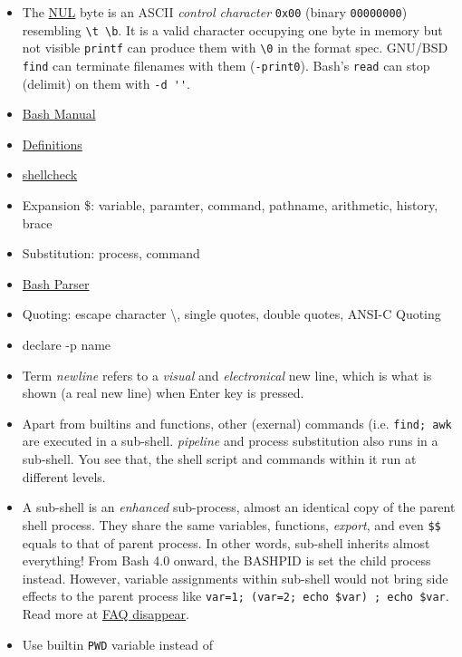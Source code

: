 \begin{itemize}
\item The \uline{NUL} byte is an ASCII \textit{control character}
  \lstinline|0x00| (binary \lstinline|00000000|) resembling
  \lstinline|\t \b|. It is a valid character occupying one byte in
  memory but not visible \lstinline|printf| can produce them with
  \lstinline|\0| in the format spec. GNU/BSD \lstinline|find| can
  terminate filenames with them (\lstinline|-print0|). Bash's
  \lstinline|read| can stop (delimit) on them with
  \lstinline|-d ''|.
\item 
  \href{https://www.gnu.org/software/bash/manual/bash.html}{Bash
    Manual}
\item
  \href{https://www.gnu.org/software/bash/manual/bash.html#Definitions}{Definitions}
\item \href{https://github.com/koalaman/shellcheck}{shellcheck}
\item Expansion \$: variable, paramter, command, pathname,
  arithmetic, history, brace
\item Substitution: process, command
\item \href{http://mywiki.wooledge.org/BashParser}{Bash Parser}
\item Quoting: escape character \textbackslash{}, single quotes,
  double quotes, ANSI-C Quoting
\item declare -p name
\item Term \textit{newline} refers to a \textit{visual} and
  \textit{electronical} new line, which is what is shown (a real
  new line) when Enter key is pressed.
\item Apart from builtins and functions, other (exernal) commands
  (i.e. \lstinline|find; awk| are executed in a
  sub-shell. \textit{pipeline} and process substitution
  also runs in a sub-shell. You see that, the shell script and
  commands within it run at different levels.
\item A sub-shell is an \textit{enhanced} sub-process, almost an
  identical copy of the parent shell process. They share the same
  variables, functions, \textit{export}, and even
  \lstinline|$$| equals to that of parent process. In other words,
  sub-shell inherits almost everything! From Bash 4.0 onward, the
  BASHPID is set the child process instead. However, variable
  assignments within sub-shell would not bring side effects to the
  parent process like
  \lstinline|var=1; (var=2; echo $var) ; echo $var|. Read more at
  \href{http://mywiki.wooledge.org/BashFAQ/024}{FAQ disappear}.
\item Use builtin \lstinline|PWD| variable instead of

\end{itemize}
